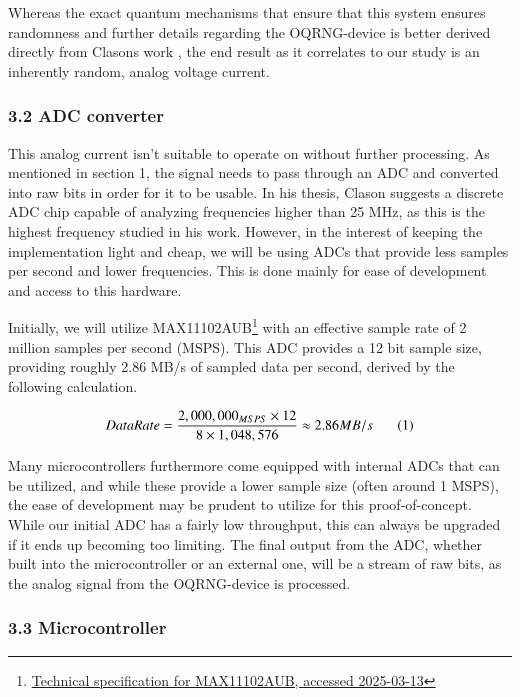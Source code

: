 \documentclass{sigchi}
\begin{document}
Whereas the exact quantum mechanisms that ensure that this system ensures randomness and further details regarding the OQRNG-device is better derived directly from Clasons work \cite{Clason2023}, the end result as it correlates to our study is an inherently random, analog voltage current.

\subsubsection{3.2 ADC converter}\label{adc-converter}

This analog current isn't suitable to operate on without further processing. As mentioned in section 1, the signal needs to pass through an ADC and converted into raw bits in order for it to be usable. In his thesis, Clason \cite{Clason2023} suggests a discrete ADC chip capable of analyzing frequencies higher than 25 MHz, as this is the highest frequency studied in his work. However, in the interest of keeping the implementation light and cheap, we will be using ADCs that provide less samples per second and lower frequencies. This is done mainly for ease of development and access to this hardware.

Initially, we will utilize MAX11102AUB\footnote{\href{https://www.farnell.com/datasheets/1913106.pdf}{Technical specification for MAX11102AUB, accessed 2025-03-13}} with an effective sample rate of 2 million samples per second (MSPS). This ADC provides a 12 bit sample size, providing roughly 2.86 MB/s of sampled data per second, derived by the following calculation.

\[
Data Rate = \frac{2,000,000_{MSPS} \times 12}{8 \times 1,048,576} \approx 2.86 MB/s \text{\phantom{123} (1)}
\]

Many microcontrollers furthermore come equipped with internal ADCs that can be utilized, and while these provide a lower sample size (often around 1 MSPS), the ease of development may be prudent to utilize for this proof-of-concept. While our initial ADC has a fairly low throughput, this can always be upgraded if it ends up becoming too limiting. The final output from the ADC, whether built into the microcontroller or an external one, will be a stream of raw bits, as the analog signal from the OQRNG-device is processed.

\subsubsection{3.3 Microcontroller}\label{microcontroller}
\end{document}
